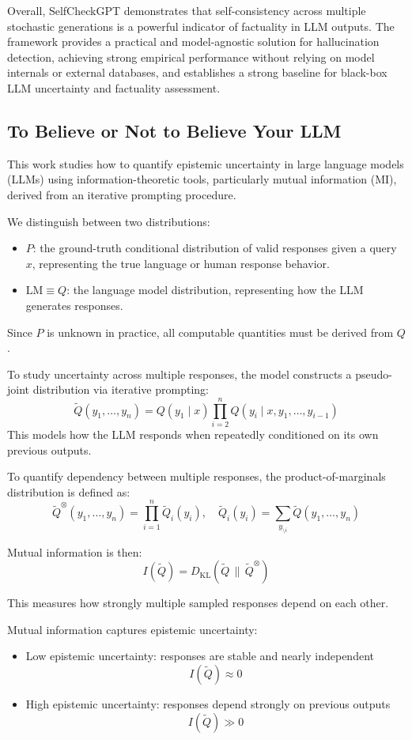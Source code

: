 Overall, SelfCheckGPT demonstrates that self-consistency across multiple stochastic generations is a powerful indicator of factuality in LLM outputs. The framework provides a practical and model-agnostic solution for hallucination detection, achieving strong empirical performance without relying on model internals or external databases, and establishes a strong baseline for black-box LLM uncertainty and factuality assessment.

\subsection{To Believe or Not to Believe Your LLM}

This work studies how to quantify epistemic uncertainty in large language models (LLMs) using information-theoretic tools, particularly mutual information (MI), derived from an iterative prompting procedure.


We distinguish between two distributions:
\begin{itemize}
    \item $P$: the ground-truth conditional distribution of valid responses given a query $x$, representing the true language or human response behavior.
    \item $\text{LM} \equiv Q$: the language model distribution, representing how the LLM generates responses.
\end{itemize}

Since $P$ is unknown in practice, all computable quantities must be derived from $Q$.


To study uncertainty across multiple responses, the model constructs a pseudo-joint distribution via iterative prompting:
\[
\widetilde Q(y_1,\dots,y_n)
=
Q(y_1 \mid x)
\prod_{i=2}^n Q(y_i \mid x, y_1,\dots,y_{i-1})
\]
This models how the LLM responds when repeatedly conditioned on its own previous outputs.


To quantify dependency between multiple responses, the product-of-marginals distribution is defined as:
\[
\widetilde Q^{\otimes}(y_1,\dots,y_n)
=
\prod_{i=1}^n \widetilde Q_i(y_i),
\quad
\widetilde Q_i(y_i)
=
\sum_{y_{\setminus i}} \widetilde Q(y_1,\dots,y_n)
\]

Mutual information is then:
\[
I(\widetilde Q)
=
D_{\mathrm{KL}}(\widetilde Q \,\|\, \widetilde Q^{\otimes})
\]

This measures how strongly multiple sampled responses depend on each other.


Mutual information captures epistemic uncertainty:
\begin{itemize}
    \item Low epistemic uncertainty: responses are stable and nearly independent
    \[
    I(\widetilde Q) \approx 0
    \]
    \item High epistemic uncertainty: responses depend strongly on previous outputs
    \[
    I(\widetilde Q) \gg 0
    \]
\end{itemize}


